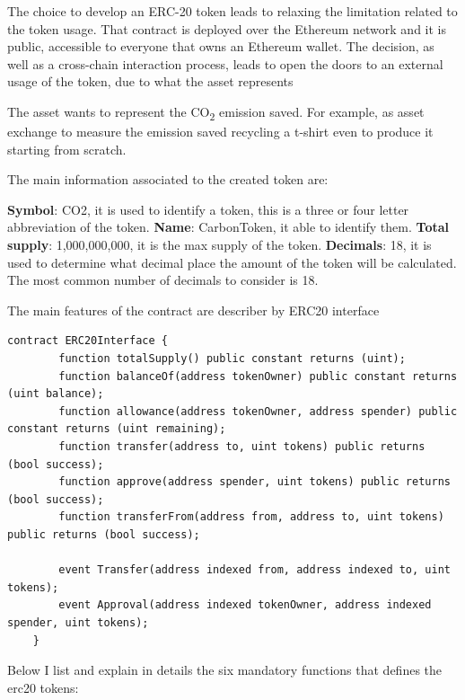 The choice to develop an ERC-20 token leads to relaxing the limitation related to the token usage. That 
contract is deployed over the Ethereum network and it is public, accessible to everyone that owns an Ethereum 
wallet. The decision, as well as a cross-chain interaction process, leads to open the doors to an external usage 
of the token, due to what the asset represents
\bigskip

The asset wants to represent the CO\textsubscript{2} emission saved. For example, as asset exchange to measure 
the emission saved recycling a t-shirt even to produce it starting from scratch.
\bigskip

The main information associated to the created token are: 

\begin{outline}
    \1 \textbf{Symbol}: CO2, it is used to identify a token, this is a three or four letter abbreviation of the token.
    \1 \textbf{Name}: CarbonToken, it able to identify them.
    \1 \textbf{Total supply}: 1,000,000,000, it is the max supply of the token.
    \1 \textbf{Decimals}: 18, it is used to determine what decimal place the amount of the token will be calculated. 
    The most common number of decimals to consider is 18. 
\end{outline}

The main features of the contract are describer by ERC20 interface

\begin{lstlisting}[language=Solidity]
    contract ERC20Interface {
        function totalSupply() public constant returns (uint);
        function balanceOf(address tokenOwner) public constant returns (uint balance);
        function allowance(address tokenOwner, address spender) public constant returns (uint remaining);
        function transfer(address to, uint tokens) public returns (bool success);
        function approve(address spender, uint tokens) public returns (bool success);
        function transferFrom(address from, address to, uint tokens) public returns (bool success);
    
        event Transfer(address indexed from, address indexed to, uint tokens);
        event Approval(address indexed tokenOwner, address indexed spender, uint tokens);
    }
\end{lstlisting}

\bigskip

Below I list and explain in details the six mandatory functions that defines the erc20 tokens:


